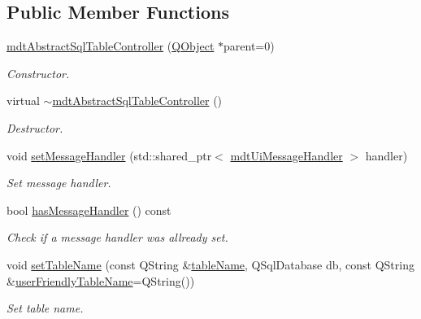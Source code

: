 \subsection*{Public Member Functions}
\begin{DoxyCompactItemize}
\item 
\hyperlink{classmdt_abstract_sql_table_controller_aa0a7c138fe64931faad0f94bcb34f9a8}{mdt\-Abstract\-Sql\-Table\-Controller} (\hyperlink{class_q_object}{Q\-Object} $\ast$parent=0)
\begin{DoxyCompactList}\small\item\em Constructor. \end{DoxyCompactList}\item 
virtual \hyperlink{classmdt_abstract_sql_table_controller_a5fc7cf40c3dde3b5bbabca5a28c2c221}{$\sim$mdt\-Abstract\-Sql\-Table\-Controller} ()
\begin{DoxyCompactList}\small\item\em Destructor. \end{DoxyCompactList}\item 
void \hyperlink{classmdt_abstract_sql_table_controller_ab3939b6f1d191283709efdf0f64c524a}{set\-Message\-Handler} (std\-::shared\-\_\-ptr$<$ \hyperlink{classmdt_ui_message_handler}{mdt\-Ui\-Message\-Handler} $>$ handler)
\begin{DoxyCompactList}\small\item\em Set message handler. \end{DoxyCompactList}\item 
bool \hyperlink{classmdt_abstract_sql_table_controller_ab0a83cfc65c3b6569396f60a25cf7323}{has\-Message\-Handler} () const 
\begin{DoxyCompactList}\small\item\em Check if a message handler was allready set. \end{DoxyCompactList}\item 
void \hyperlink{classmdt_abstract_sql_table_controller_a5a94417dc46a7dc6de8b5ba0593494a7}{set\-Table\-Name} (const Q\-String \&\hyperlink{classmdt_abstract_sql_table_controller_aaf864d069aeb74068b6daa747b740944}{table\-Name}, Q\-Sql\-Database db, const Q\-String \&\hyperlink{classmdt_abstract_sql_table_controller_a1a9b3d3e4009acd32fc4a083f738fc62}{user\-Friendly\-Table\-Name}=Q\-String())
\begin{DoxyCompactList}\small\item\em Set table name. \end{DoxyCompactList}\item 

\end{DoxyCompactItemize}
